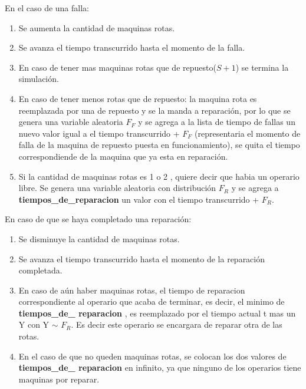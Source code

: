 \documentclass[12pt]{article}
\begin{document}
\noindent En el caso de una falla:
\begin{enumerate}
    \item Se aumenta la cantidad de maquinas rotas.
    \item Se avanza el tiempo transcurrido hasta el momento de la falla.
    \item En caso de tener mas maquinas rotas que de repuesto($S +1$) se termina la simulación.
    \item En caso de tener menos rotas que de repuesto:
        la maquina rota es reemplazada por una de repuesto y se la manda a reparación, por lo que se genera una variable aleatoria $F_F$ y se agrega  a la lista de tiempo de fallas un nuevo valor igual a el tiempo transcurrido + $F_F$ (representaria el momento de falla de  la maquina de repuesto puesta en funcionamiento), se quita el tiempo correspondiende de la maquina que ya esta en reparación.
    \item Si la cantidad de maquinas rotas es 1 o 2 , quiere decir que habia un operario libre. Se genera una variable aleatoria con distribución $F_R$ y se agrega a  {\bf tiempos\_de\_reparacion} un valor con el tiempo transcurrido + $F_R$.
\end{enumerate}

\noindent En caso de que se haya completado una  reparación:

\begin{enumerate}
    \item Se disminuye la cantidad de maquinas rotas.
    \item Se avanza el tiempo transcurrido hasta el momento de la reparación completada.
    \item En caso de aún haber  maquinas rotas, el tiempo de reparacion correspondiente al operario que acaba de terminar, es decir, el minimo de {\bf tiempos\_de\_ reparacion} , es reemplazado por el tiempo actual t mas un Y con Y $\sim$ $F_R$. Es decir este operario se encargara de reparar otra de las rotas.
   \item En el caso de que no queden maquinas rotas, se colocan los dos valores de  {\bf tiempos\_de\_ reparacion} en infinito, ya que ninguno de los operarios tiene maquinas por reparar.
\end{enumerate}
\end{document}
